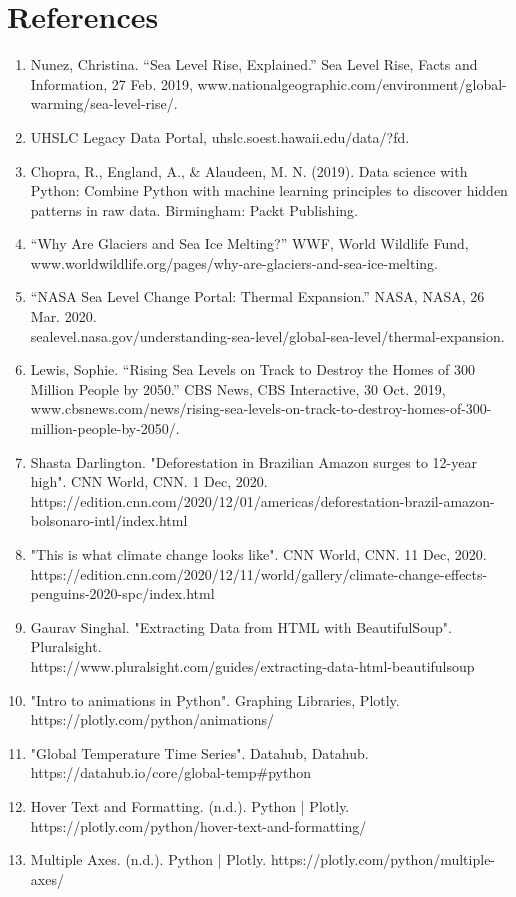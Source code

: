 \documentclass[fontsize=11pt]{article}
\begin{document}
    \section*{References}
    \begin{enumerate}
        \item
        Nunez, Christina. “Sea Level Rise, Explained.” Sea Level Rise, Facts and Information, 27 Feb. 2019, www.nationalgeographic.com/environment/global-warming/sea-level-rise/.
        \item
        UHSLC Legacy Data Portal, uhslc.soest.hawaii.edu/data/?fd.
        \item
        Chopra, R., England, A., \& Alaudeen, M. N. (2019). Data science with Python: Combine Python with machine learning principles to discover hidden patterns in raw data. Birmingham: Packt Publishing.
        \item
        “Why Are Glaciers and Sea Ice Melting?” WWF, World Wildlife Fund, www.worldwildlife.org/pages/why-are-glaciers-and-sea-ice-melting.
        \item
        “NASA Sea Level Change Portal: Thermal Expansion.” NASA, NASA, 26 Mar. 2020.\\ sealevel.nasa.gov/understanding-sea-level/global-sea-level/thermal-expansion.
        \item
        Lewis, Sophie. “Rising Sea Levels on Track to Destroy the Homes of 300 Million People by 2050.” CBS News, CBS Interactive, 30 Oct. 2019, www.cbsnews.com/news/rising-sea-levels-on-track-to-destroy-homes-of-300-million-people-by-2050/.
        \item
        Shasta Darlington. "Deforestation in Brazilian Amazon surges to 12-year high". CNN World, CNN. 1 Dec, 2020.\\ https://edition.cnn.com/2020/12/01/americas/deforestation-brazil-amazon-bolsonaro-intl/index.html
        \item
        "This is what climate change looks like". CNN World, CNN. 11 Dec, 2020.\\
        https://edition.cnn.com/2020/12/11/world/gallery/climate-change-effects-penguins-2020-spc/index.html
        \item
        Gaurav Singhal. "Extracting Data from HTML with BeautifulSoup". Pluralsight.\\ https://www.pluralsight.com/guides/extracting-data-html-beautifulsoup
        \item
        "Intro to animations in Python". Graphing Libraries, Plotly. https://plotly.com/python/animations/
        \item
        "Global Temperature Time Series". Datahub, Datahub. https://datahub.io/core/global-temp\#python
        \item
        Hover Text and Formatting. (n.d.). Python | Plotly. https://plotly.com/python/hover-text-and-formatting/
        \item
        Multiple Axes. (n.d.). Python | Plotly. https://plotly.com/python/multiple-axes/
    \end{enumerate}
\end{document}
